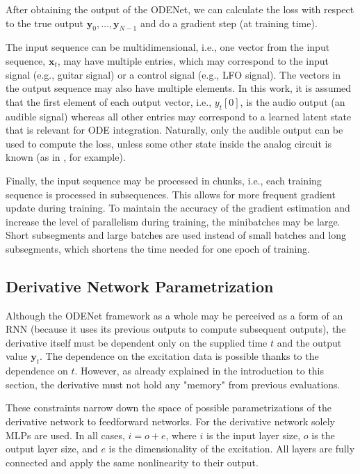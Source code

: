 After obtaining the output of the ODENet, we can calculate the loss with respect to the true output $\pmb{y}_0, \dots, \pmb{y}_{N-1}$ and do a gradient step (at training time).

The input sequence can be multidimensional, i.e., one vector from the input sequence, $\pmb{x}_t$, may have multiple entries, which may correspond to the input signal (e.g., guitar signal) or a control signal (e.g., \ac{LFO} signal). The vectors in the output sequence may also have multiple elements. In this work, it is assumed that the first element of each output vector, i.e., $y_t[0]$, is the audio output (an audible signal) whereas all other entries may correspond to a learned latent state that is relevant for \ac{ODE} integration. Naturally, only the audible output can be used to compute the loss, unless some other state inside the analog circuit is known (as in \cite{Parker2019}, for example).

Finally, the input sequence may be processed in chunks, i.e., each training sequence is processed in subsequences. This allows for more frequent gradient update during training. To maintain the accuracy of the gradient estimation and increase the level of parallelism during training, the minibatches may be large. Short subsegments and large batches are used instead of small batches and long subsegments, which shortens the time needed for one epoch of training.

\subsection{Derivative Network Parametrization}

Although the ODENet framework as a whole may be perceived as a form of an \ac{RNN} (because it uses its previous outputs to compute subsequent outputs), the derivative itself must be dependent only on the supplied time $t$ and the output value $\pmb{y}_t$. The dependence on the excitation data is possible thanks to the dependence on $t$. However, as already explained in the introduction to this section, the derivative must not hold any "memory" from previous evaluations.

These constraints narrow down the space of possible parametrizations of the derivative network to feedforward networks. For the derivative network solely \acp{MLP} are used. In all cases, $i = o + e$, where $i$ is the input layer size, $o$ is the output layer size, and $e$ is the dimensionality of the excitation. All layers are fully connected and apply the same nonlinearity to their output.
